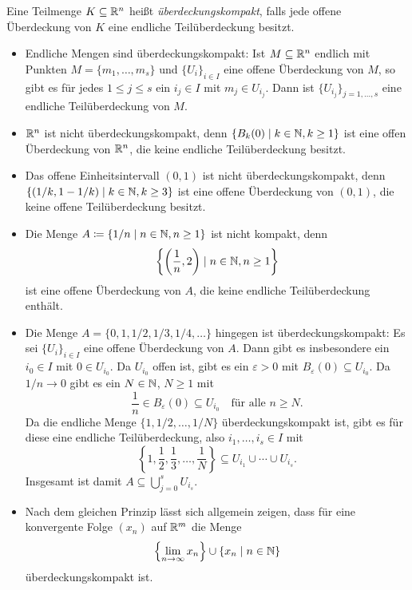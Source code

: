 \documentclass[a4paper,10pt]{article}
\begin{document}
\begin{defi}
 Eine Teilmenge $K \subseteq \mathbb{R}^n$ heißt \emph{überdeckungskompakt}, falls jede offene Überdeckung von $K$ eine endliche Teilüberdeckung besitzt.
\end{defi}


\begin{bsp}
 \begin{itemize}
  \item
   Endliche Mengen sind überdeckungskompakt: Ist $M \subseteq \mathbb{R}^n$ endlich mit Punkten $M = \{m_1, \dotsc, m_s\}$ und $\{U_i\}_{i \in I}$ eine offene Überdeckung von $M$, so gibt es für jedes $1 \leq j \leq s$ ein $i_j \in I$ mit $m_j \in U_{i_j}$. Dann ist $\{U_{i_j}\}_{j=1,\dotsc,s}$ eine endliche Teilüberdeckung von $M$.
  \item
   $\mathbb{R}^n$ ist nicht überdeckungskompakt, denn $\{B_k(0) \mid k \in \mathbb{N}, k \geq 1\}$ ist eine offen Überdeckung von $\mathbb{R}^n$, die keine endliche Teilüberdeckung besitzt.
  \item
   Das offene Einheitsintervall $(0,1)$ ist nicht überdeckungskompakt, denn $\{(1/k, 1-1/k) \mid k \in \mathbb{N}, k \geq 3\}$ ist eine offene Überdeckung von $(0,1)$, die keine offene Teilüberdeckung besitzt.
  \item
   Die Menge $A \coloneqq \{1/n \mid n \in \mathbb{N}, n \geq 1\}$ ist nicht kompakt, denn
   \[
    \left\{ \left( \frac{1}{n}, 2 \right) \mid n \in \mathbb{N}, n \geq 1 \right\}
   \]
   ist eine offene Überdeckung von $A$, die keine endliche Teilüberdeckung enthält.
  \item
   Die Menge $A = \{0, 1, 1/2, 1/3, 1/4, \dotsc\}$ hingegen ist überdeckungskompakt: Es sei $\{U_i\}_{i \in I}$ eine offene Überdeckung von $A$. Dann gibt es insbesondere ein $i_0 \in I$ mit $0 \in U_{i_0}$. Da $U_{i_0}$ offen ist, gibt es ein $\varepsilon > 0$ mit $B_\varepsilon(0) \subseteq U_{i_0}$. Da $1/n \to 0$ gibt es ein $N \in \mathbb{N}$, $N \geq 1$ mit
   \[
    \frac{1}{n} \in B_\varepsilon(0) \subseteq U_{i_0} \quad \text{für alle $n \geq N$}.
   \]
   Da die endliche Menge $\{1, 1/2, \dotsc, 1/N\}$ überdeckungskompakt ist, gibt es für diese eine endliche Teilüberdeckung, also $i_1, \dotsc, i_s \in I$ mit
   \[
    \left\{ 1, \frac{1}{2}, \frac{1}{3}, \dotsc, \frac{1}{N} \right\} \subseteq U_{i_1} \cup \dotsb \cup U_{i_s}.
   \]
   Insgesamt ist damit $A \subseteq \bigcup_{j=0}^s U_{i_s}$.
  \item
   Nach dem gleichen Prinzip lässt sich allgemein zeigen, dass für eine konvergente Folge $(x_n)$ auf $\mathbb{R}^m$ die Menge
   \[
    \left\{\lim_{n \to \infty} x_n\right\} \cup \{x_n \mid n \in \mathbb{N}\}
   \]
   überdeckungskompakt ist.
 \end{itemize}
\end{bsp}
\end{document}
